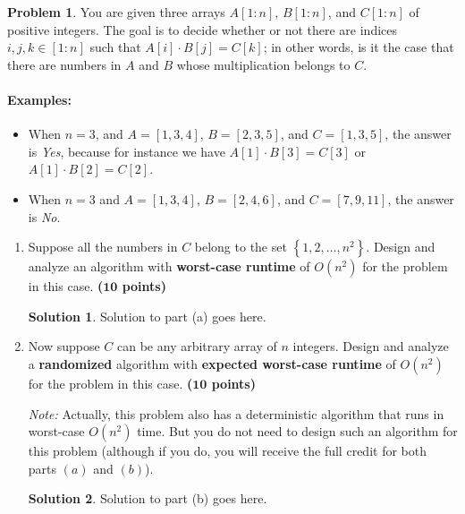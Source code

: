 \documentclass{article}
\theoremstyle{definition}
\newtheorem{problem}{Problem}
\newtheorem*{solution*}{Solution}
\newenvironment{solution}{\begin{solution*}}{{} \end{solution*}}
\newcommand{\grade}[1]{\hfill{\textbf{($\mathbf{#1}$ points)}}}
\newcommand{\set}[1]{\ensuremath{\left\{ #1 \right\}}}
\begin{document}
\begin{problem}\label{hash}
	You are given three arrays $A[1:n]$, $B[1:n]$, and $C[1:n]$ of positive integers. The goal is to decide whether or not there are indices $i,j,k \in [1:n]$ such that $A[i] \cdot B[j] = C[k]$; in other words, is it the case that there are numbers in $A$ and $B$ whose multiplication belongs to $C$. 
	
	
	\paragraph{Examples:} 
	\begin{itemize}
		\item When $n=3$, and $A = [1,3,4]$, $B=[2,3,5]$, and $C=[1,3,5]$, the answer is \emph{Yes}, because for instance we have $A[1] \cdot B[3] = C[3]$ or $A[1] \cdot B[2] = C[2]$. 
		\item When $n=3$ and $A = [1,3,4]$, $B=[2,4,6]$, and $C=[7,9,11]$, the answer is \emph{No}. 
	\end{itemize} 
	
	\begin{enumerate}[label=$(\alph*)$]
	\item Suppose all the numbers in $C$ belong to the set $\set{1,2,\ldots, n^2}$. Design and analyze an algorithm with \textbf{worst-case runtime} of $O(n^2)$ for the problem in this case. \grade{10} 
	\bigskip	
	\begin{solution}
	Solution to part (a) goes here. 
	\end{solution}
	
	
	\newpage
	\item Now suppose $C$ can be any arbitrary array of $n$ integers. Design and analyze a \textbf{randomized} algorithm with \textbf{expected worst-case runtime} of $O(n^2)$ for the problem in this case. \grade{10} 

	\medskip
	\emph{Note:} Actually, this problem also has a deterministic algorithm that runs in worst-case $O(n^2)$ time. But you do not need to design such an algorithm for this problem (although if you do, you will receive the full credit for both parts $(a)$ and $(b)$).
	
	\bigskip	
	\begin{solution}
	Solution to part (b) goes here. 
	\end{solution}
	
	
	\end{enumerate}
	
	
\end{problem}
\end{document}

